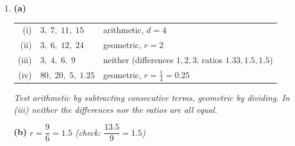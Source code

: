 \documentclass[12pt, twoside]{article}
\begin{document}
\begin{enumerate}[itemsep=0.3cm]
$u_{5} = u_{1} + 4d \;\Rightarrow\; 31 = u_{1} - 16 \;\Rightarrow\;
u_{1} = 47$

\emph{Or solve the simultaneous equations $u_{1} + 4d = 31$,
$u_{1} + 11d = 3$ on the GDC.}

\medskip

\textbf{(b)} $u_{n} = 47 - 4(n - 1)$

\emph{Accept $u_{n} = 51 - 4n$.}

\medskip

\textbf{(c)} $47 - 4(n - 1) < 0 \;\Rightarrow\; 4(n - 1) > 47
\;\Rightarrow\; n - 1 > 11.75 \;\Rightarrow\; n > 12.75$, so $n = 13$.

$u_{12} = 3$ and $u_{13} = 47 - 4(13 - 1) = -1$. The first negative term is $-1$ (the
$13^{\text{th}}$ term).

\emph{The question asks for the term, not $n$: the answer is $-1$.}

\medskip

\textbf{(d)} Equal differences: \ $3k - (k + 2) = (4k + 1) - 3k$

$2k - 2 = k + 1 \;\Rightarrow\; k = 3$

First three terms: $5,\; 9,\; 13$ \quad ($d = 4$)

\medskip

\textbf{(e)} $u_{20} = 5 + 4(20 - 1) = 5 + 76 = 81$

\newpage

\item[3.]

\textbf{(a)}

\begin{tabular}{rll}
(i) & $3,\; 7,\; 11,\; 15$ & arithmetic, $d = 4$ \\
(ii) & $3,\; 6,\; 12,\; 24$ & geometric, $r = 2$ \\
(iii) & $3,\; 4,\; 6,\; 9$ & neither (differences $1, 2, 3$; ratios
$1.33, 1.5, 1.5$) \\
(iv) & $80,\; 20,\; 5,\; 1.25$ & geometric, $r = \frac{1}{4} = 0.25$ \\
\end{tabular}

\emph{Test arithmetic by subtracting consecutive terms, geometric by
dividing. In (iii) neither the differences nor the ratios are all
equal.}

\medskip

\textbf{(b)} $r = \dfrac{9}{6} = 1.5$ \quad \emph{(check:
$\dfrac{13.5}{9} = 1.5$)}


\end{enumerate}
\end{document}

